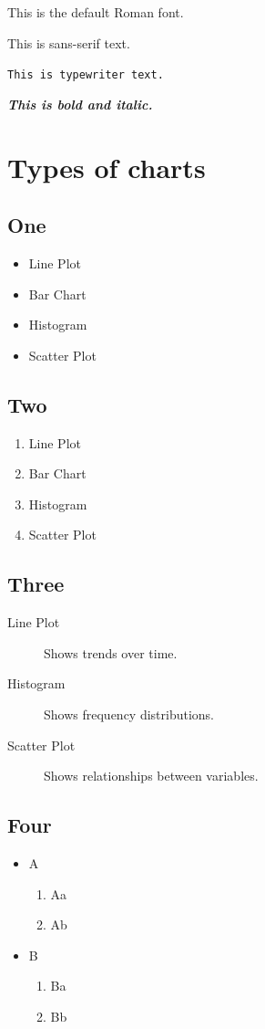 \documentclass[12pt,a4paper]{article}
\begin{document}
This is the default Roman font.

\noindent\textsf{This is sans-serif text.}

\noindent\texttt{This is typewriter text.}

\noindent\textbf{\textit{This is bold and italic.}}

\section{Types of charts}
\label{sec:Types of charts}

\subsection{One}
\begin{itemize}
    \item Line Plot
    \item Bar Chart
    \item Histogram
    \item Scatter Plot
\end{itemize}

\subsection{Two}
\begin{enumerate}
    \item Line Plot
    \item Bar Chart
    \item Histogram
    \item Scatter Plot
\end{enumerate}

\subsection{Three}
\begin{description}
    \item[Line Plot] Shows trends over time.
    \item[Histogram] Shows frequency distributions.
    \item[Scatter Plot] Shows relationships between variables.
\end{description}

\subsection{Four}
\begin{itemize}
    \item A
    \begin{enumerate}
        \item Aa
        \item Ab
    \end{enumerate}

    \item B
    \begin{enumerate}
        \item Ba
        \item Bb
    \end{enumerate}
\end{itemize}
\end{document}
